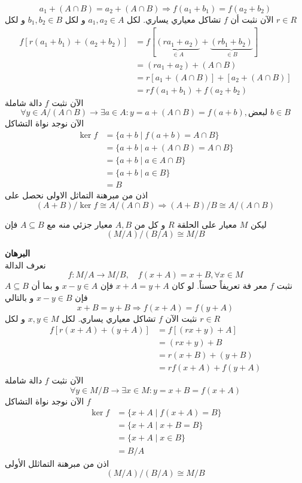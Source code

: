 \[
a_1 + (A\cap B) = a_2 + (A\cap B) \Rightarrow f(a_1 + b_1) = f(a_2+b_2)
\] 
الآن نثبت أن $f$ تشاكل معياري يساري. لكل $a_1,a_2\in A$ و لكل $b_1,b_2\in B$ و لكل $r\in R$
\begin{align*}
	f[r(a_1+b_1)+(a_2+b_2)] &= f[\underbrace{(ra_1+a_2)}_{\in A} + \underbrace{(rb_1+b_2)}_{\in B}]\\
	&= (ra_1+a_2) + (A\cap B) \\
	&= r[a_1+(A\cap B)] + [a_2 + (A\cap B)]\\
	&= rf(a_1+b_1) + f(a_2+b_2) 
\end{align*}
الآن نثبت $f$ دالة شاملة
\[
\forall y\in A/(A\cap B) \to \exists a\in A: y=a+(A\cap B) = f(a+b), \text{لبعض $b\in B$} 
\]
الآن نوجد نواة التشاكل
\begin{align*}
	\ker f &= \{a+b \mid f(a+b) = A\cap B\}\\
	&= \{a+b \mid a+(A\cap B) = A\cap B\} \\
	&= \{a+b\mid a\in A\cap B\}\\
	&= \{a+b \mid a\in B\} \\&= B
\end{align*}
اذن من مبرهنة التماثل الاولى نحصل على
\[
\boxed{(A+B)/\ker f \cong A/(A\cap B)} \Rightarrow \boxed{(A+B)/B \cong A/(A\cap B)}
\]
\newpage
\begin{theorem}
	 ليكن $M$ معيار على الحلقة $R$ و كل من $A, B$ معيار جزئي منه مع $A\subseteq B$ فإن
	 \[
	 (M/A) / (B/A) \cong M/B
	 \]
\end{theorem}
\noindent
\textbf{البرهان}\\
\noindent
نعرف الدالة
\[
f:M/A \to M/B, \quad f(x+A) = x+B, \forall x\in M
\]
نثبت $f$ معر فة تعريفاً حسناً. لو كان $x+A=y+A$ فإن $x-y\in A$ و بما أن $A\subseteq B$ فإن $x-y\in B$ و بالتالي
\[
x+B = y+B \Rightarrow f(x+A) = f(y+A)
\]  
نثبت الآن $f$ تشاكل معياري يساري. لكل $x,y\in M$ و لكل $r\in R$
\begin{align*}
	f[r(x+A) + (y+A)] &= f[(rx+y) + A] \\
	&= (rx+y) + B\\
	&= r(x+B) + (y+B)\\
	&= rf(x+A) + f(y+A)
\end{align*}
الآن نثبت $f$ دالة شاملة
\[
\forall y\in M/B \to \exists x\in M : y = x+B = f(x+A) 
\]
الآن نوجد نواة التشاكل $f$
\begin{align*}
	\ker f &= \{x+A \mid f(x+A) = B\}\\
	&= \{x+A\mid x+B = B\}\\
	&= \{x+A\mid x\in B\}\\
	&= B/A 
\end{align*}
اذن من مبرهنة التماثلل الأولى
\[
(M/A) / (B/A) \cong M/B 
\]



